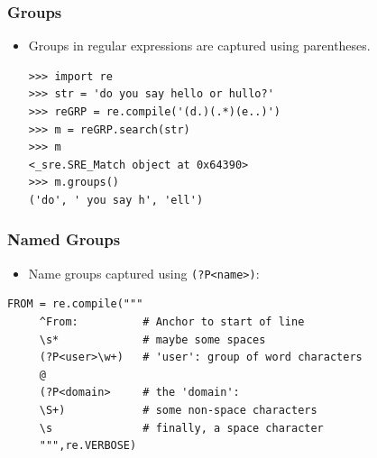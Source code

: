 





\begin{frame}[fragile]
\frametitle{Groups}

\begin{itemize}
\item Groups in regular expressions are captured using parentheses.
\begin{verbatim}
>>> import re
>>> str = 'do you say hello or hullo?'
>>> reGRP = re.compile('(d.)(.*)(e..)')
>>> m = reGRP.search(str)
>>> m
<_sre.SRE_Match object at 0x64390>
>>> m.groups()
('do', ' you say h', 'ell')
\end{verbatim}
\end{itemize}

\end{frame}

\begin{frame}[fragile]
\frametitle{Named Groups}

\begin{itemize}
\item Name groups captured using \verb!(?P<name>)!:
\end{itemize}
{\small
\begin{verbatim}
FROM = re.compile("""
     ^From:          # Anchor to start of line
     \s*             # maybe some spaces
     (?P<user>\w+)   # 'user': group of word characters 
     @               
     (?P<domain>     # the 'domain':
     \S+)            # some non-space characters
     \s              # finally, a space character
     """,re.VERBOSE)
\end{verbatim}
}
\end{frame}

